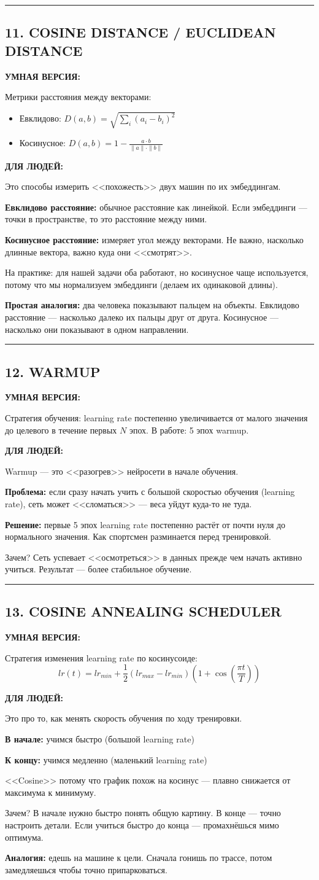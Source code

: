 \documentclass[12pt,a4paper]{article}
\newcommand{\term}[3]{
\noindent\rule{\textwidth}{1pt}
\subsection*{#1}

\textcolor{smartgreen}{\textbf{УМНАЯ ВЕРСИЯ:}}

#2

\vspace{0.5em}
\textcolor{simpleblue}{\textbf{ДЛЯ ЛЮДЕЙ:}}

#3

\vspace{1em}
}
\begin{document}
\term{11. COSINE DISTANCE / EUCLIDEAN DISTANCE}
{Метрики расстояния между векторами:
\begin{itemize}
\item Евклидово: $D(a,b) = \sqrt{\sum_i (a_i - b_i)^2}$
\item Косинусное: $D(a,b) = 1 - \frac{a \cdot b}{\|a\| \cdot \|b\|}$
\end{itemize}}
{Это способы измерить <<похожесть>> двух машин по их эмбеддингам.

\textbf{Евклидово расстояние:} обычное расстояние как линейкой. Если эмбеддинги — точки в пространстве, то это расстояние между ними.

\textbf{Косинусное расстояние:} измеряет угол между векторами. Не важно, насколько длинные вектора, важно куда они <<смотрят>>.

На практике: для нашей задачи оба работают, но косинусное чаще используется, потому что мы нормализуем эмбеддинги (делаем их одинаковой длины).

\textbf{Простая аналогия:} два человека показывают пальцем на объекты. Евклидово расстояние — насколько далеко их пальцы друг от друга. Косинусное — насколько они показывают в одном направлении.}

\term{12. WARMUP}
{Стратегия обучения: learning rate постепенно увеличивается от малого значения до целевого в течение первых $N$ эпох. В работе: 5 эпох warmup.}
{Warmup — это <<разогрев>> нейросети в начале обучения.

\textbf{Проблема:} если сразу начать учить с большой скоростью обучения (learning rate), сеть может <<сломаться>> — веса уйдут куда-то не туда.

\textbf{Решение:} первые 5 эпох learning rate постепенно растёт от почти нуля до нормального значения. Как спортсмен разминается перед тренировкой.

Зачем? Сеть успевает <<осмотреться>> в данных прежде чем начать активно учиться. Результат — более стабильное обучение.}

\term{13. COSINE ANNEALING SCHEDULER}
{Стратегия изменения learning rate по косинусоиде:
\[
lr(t) = lr_{min} + \frac{1}{2}(lr_{max} - lr_{min})\left(1 + \cos\left(\frac{\pi t}{T}\right)\right)
\]}
{Это про то, как менять скорость обучения по ходу тренировки.

\textbf{В начале:} учимся быстро (большой learning rate)

\textbf{К концу:} учимся медленно (маленький learning rate)

<<Cosine>> потому что график похож на косинус — плавно снижается от максимума к минимуму.

Зачем? В начале нужно быстро понять общую картину. В конце — точно настроить детали. Если учиться быстро до конца — промахнёшься мимо оптимума.

\textbf{Аналогия:} едешь на машине к цели. Сначала гонишь по трассе, потом замедляешься чтобы точно припарковаться.}
\end{document}
